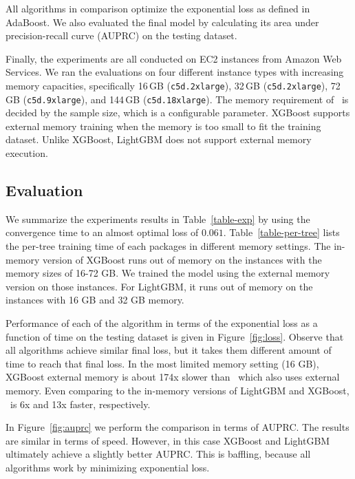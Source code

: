 All algorithms in comparison optimize the exponential loss as defined in AdaBoost.
We also evaluated the final model by calculating its area under precision-recall
curve (AUPRC) on the testing dataset.

Finally, the experiments are all conducted on EC2 instances from Amazon Web Services.
We ran the evaluations on four different instance types with increasing memory capacities,
specifically
16\,GB (\texttt{c5d.2xlarge}), 32\,GB (\texttt{c5d.2xlarge}),
72\,GB (\texttt{c5d.9xlarge}), and 144\,GB (\texttt{c5d.18xlarge}).
The memory requirement of \Sparrow\ is decided by the sample size,
which is a configurable parameter.
XGBoost supports external memory training when the memory is too small to fit the
training dataset.
Unlike XGBoost, LightGBM does not support external memory execution.


\subsection{Evaluation}

We summarize the experiments results in Table~\ref{table-exp} by
using the convergence time to an almost optimal loss of $0.061$.
Table~\ref{table-per-tree} lists the per-tree training time of each packages
in different memory settings.
The in-memory version of XGBoost runs out of memory on the instances with
the memory sizes of 16-72 GB. We trained the model using the external memory
version on those instances.
For LightGBM, it runs out of memory on the instances with 16 GB and 32 GB memory.


Performance of each of the algorithm in terms of
the exponential loss as a function of time on the testing dataset is given in
Figure~\ref{fig:loss}. Observe that all algorithms achieve similar
final loss, but it takes them different amount of time to reach that
final loss.
In the most limited memory setting (16 GB),
XGBoost external memory is about 174x
 slower than \Sparrow\ which also uses external memory.
Even comparing to the in-memory versions of LightGBM and XGBoost,
\Sparrow\ is 6x and 13x faster, respectively.

In Figure~\ref{fig:auprc} we perform the comparison in terms of
AUPRC. The results are similar in terms of speed. However, in this
case XGBoost and LightGBM ultimately achieve a slightly better
AUPRC. This is baffling, because all algorithms work by minimizing
exponential loss.

